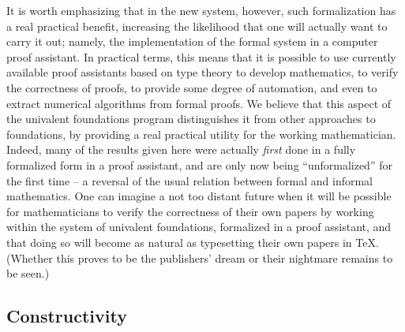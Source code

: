 {It is worth emphasizing that in the new system, however, such formalization has a real practical benefit, increasing the likelihood that one will actually want to carry it out; namely, the implementation of the formal system in a computer proof assistant.  In practical terms, this means that it is possible to use currently available proof assistants based on type theory to develop mathematics, to verify the correctness of proofs, to provide some degree of automation, and even to extract numerical algorithms from formal proofs.  We believe that this aspect of the univalent foundations program distinguishes it from other approaches to foundations, by providing a real practical utility for the working mathematician. Indeed, many of the results given here were actually \emph{first} done in a fully formalized form in a proof assistant, and are only now being ``unformalized'' for the first time -- a reversal of the usual relation between formal and informal mathematics.   One can imagine a not too distant future when it will be possible for mathematicians  to verify the correctness of their own papers by working within the system of univalent foundations, formalized in a proof assistant, and that doing so will become as natural as typesetting their own papers in \TeX. (Whether this proves to be the publishers' dream or their nightmare  remains to be seen.) 



\subsection*{Constructivity} 


}
